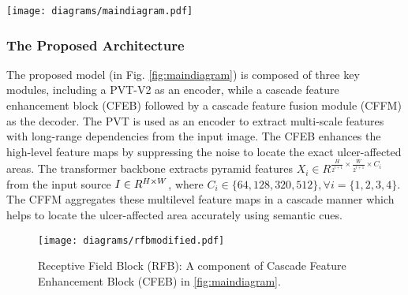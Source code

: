 \documentclass[review]{elsarticle}
\begin{document}
\begin{figure*}[h!]
	\centering
	\texttt{[image: diagrams/maindiagram.pdf]}
	\caption{The proposed architecture of Diabetic Foot Ulcer Segmentation using ViT (DFUS-ViT). }
	\label{fig:maindiagram}
\end{figure*}

\subsubsection{The Proposed Architecture}
The proposed model (in Fig. \ref{fig:maindiagram}) is composed of three key modules, including a PVT-V2 as an encoder, while a cascade feature enhancement block (CFEB) followed by a cascade feature fusion module (CFFM) as the decoder. The PVT is used as an encoder to extract multi-scale features with long-range dependencies from the input image. The CFEB enhances the high-level feature maps by suppressing the noise to locate the exact ulcer-affected areas. The transformer backbone \cite{wang2022pvt} extracts pyramid features $X_i \in R^{\frac{H}{2^{i+1}}\times \frac{W}{2^{i+1}}\times C_i}$ from the input source $I\in R^{H\times W\time3}$, where $C_i \in \{64,128,320,512\}, \forall i =\{1,2,3,4\}$. The CFFM aggregates these multilevel feature maps in a cascade manner which helps to locate the ulcer-affected area accurately using semantic cues. 

\begin{figure}[ht!]
	\centering
	\texttt{[image: diagrams/rfbmodified.pdf]}
	\caption{Receptive Field Block (RFB): A component of Cascade Feature Enhancement Block (CFEB) in \ref{fig:maindiagram}. }
	\label{fig:rfb}
\end{figure}
\end{document}
